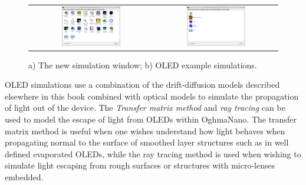 \begin{figure}[H]
\centering
\begin{tabular}{ c c }

\includegraphics[width=0.5\textwidth,height=0.4\textwidth]{./images/oled/new_simulations.png}

&
\includegraphics[width=0.5\textwidth,height=0.4\textwidth]{./images/oled/oled_new_sim.png}

\\
\end{tabular}
\caption{a) The new simulation window; b) OLED example simulations.}
\label{fig:oled1}
\end{figure}

OLED simulations use a combination of the drift-diffusion models described elsewhere in this book combined with optical models to simulate the propagation of light out of the device. The \emph{Transfer matrix method} and \emph{ray tracing} can be used to model the escape of light from OLEDs within OghmaNano. The transfer matrix method is useful when one wishes understand how light behaves when propagating normal to the surface of smoothed layer structures such as in well defined evaporated OLEDs, while the ray tracing method is used when wishing to simulate  light escaping from rough surfaces or structures with micro-lenses embedded.

